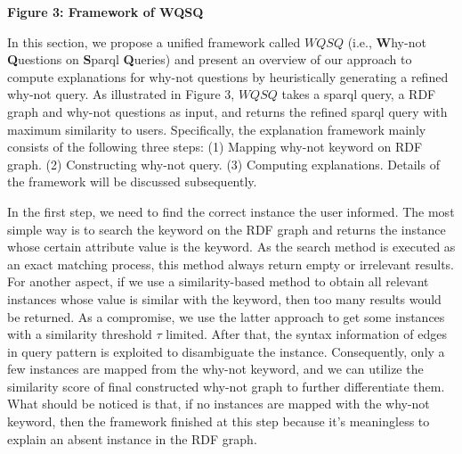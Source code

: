 \documentclass{article}
\begin{document}
\begin{center}
\textbf{Figure 3: Framework of WQSQ}
\end{center}

In this section, we propose a unified framework called $WQSQ$ (i.e., \textbf{W}hy-not \textbf{Q}uestions on \textbf{S}parql \textbf{Q}ueries) and present an overview of our approach to compute explanations for why-not questions by heuristically generating a refined why-not query. As illustrated in Figure 3, $WQSQ$ takes a sparql query, a RDF graph and why-not questions as input, and returns the refined sparql query with maximum similarity to users. Specifically, the explanation framework mainly consists of the following three steps:
(1)	Mapping why-not keyword on RDF graph.
(2)	Constructing why-not query.
(3)	Computing explanations.
Details of the framework will be discussed subsequently.

In the first step, we need to find the correct instance the user informed. The most simple way is to search the keyword on the RDF graph and returns the instance whose certain attribute value is the keyword. As the search method is executed as an exact matching process, this method always return empty or irrelevant results. For another aspect, if we use a similarity-based method to obtain all relevant instances whose value is similar with the keyword, then too many results would be returned. As a compromise, we use the latter approach to get some instances with a similarity threshold $\tau$ limited. After that, the syntax information of edges in query pattern is exploited to disambiguate the instance. Consequently, only a few instances are mapped from the why-not keyword, and we can utilize the similarity score of final constructed why-not graph to further differentiate them. What should be noticed is that, if no instances are mapped with the why-not keyword, then the framework finished at this step because it's meaningless to explain an absent instance in the RDF graph.
\end{document}
